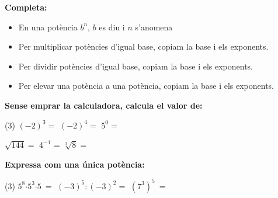 
 \vsoo
 \begin{iniaval}
 \textbf{Completa:}


\begin{itemize}
\item En una potència $b^n$, $b$ es diu \dotfill i $n$ s'anomena \dotfill

\item  Per multiplicar potències d'igual base, copiam la base i \dotfill els exponents.

\item  Per dividir potències d'igual base, copiam la base i \dotfill els exponents.

\item  Per elevar una potència a una potència, copiam la base i \dotfill els exponents.

\end{itemize}
\vspace{0.5cm}
 \textbf{Sense emprar la calculadora, calcula el valor de:}

\begin{tasks}(3)
\task ${\left(-2\right)}^3=$   \task  ${\left(-2\right)}^4=$   \task  $5^0=$ 

\task  $\sqrt{144}=$   \task $4^{-1}$ =   \task $\sqrt[3]{8}=$
 \end{tasks}

\vspace{0.5cm}
 \textbf{Expressa com una única potència:}
\begin{tasks}[resume=true](3)
\task $ 5^8\textrm{·}5^3\textrm{·}5\ =$ \task ${(-3)}^5:{(-3)}^2=$     \task ${\left(7^3\right)}^5\ =$
\end{tasks}
\vspace{0.5cm}
\end{iniaval}


